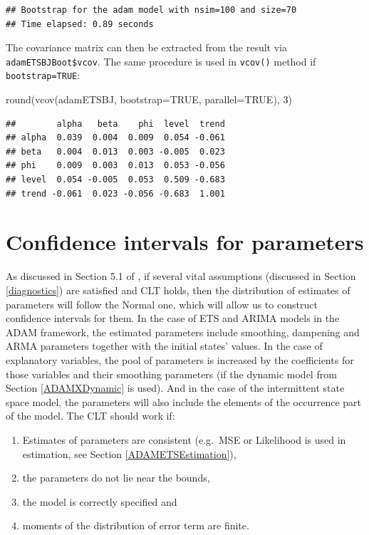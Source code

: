 \documentclass[
]{book}
\newenvironment{Shaded}{\begin{snugshade}}{\end{snugshade}}
\newcommand{\AttributeTok}[1]{\textcolor[rgb]{0.77,0.63,0.00}{#1}}
\newcommand{\ConstantTok}[1]{\textcolor[rgb]{0.00,0.00,0.00}{#1}}
\newcommand{\DecValTok}[1]{\textcolor[rgb]{0.00,0.00,0.81}{#1}}
\newcommand{\FunctionTok}[1]{\textcolor[rgb]{0.00,0.00,0.00}{#1}}
\newcommand{\NormalTok}[1]{#1}
\providecommand{\tightlist}{%
  \setlength{\itemsep}{0pt}\setlength{\parskip}{0pt}}
\theoremstyle{definition}
\theoremstyle{definition}
\theoremstyle{definition}
\theoremstyle{definition}
\theoremstyle{remark}
\begin{document}
\begin{verbatim}
## Bootstrap for the adam model with nsim=100 and size=70
## Time elapsed: 0.89 seconds
\end{verbatim}

The covariance matrix can then be extracted from the result via \texttt{adamETSBJBoot\$vcov}. The same procedure is used in \texttt{vcov()} method if \texttt{bootstrap=TRUE}:

\begin{Shaded}
\begin{Highlighting}[]
\FunctionTok{round}\NormalTok{(}\FunctionTok{vcov}\NormalTok{(adamETSBJ, }\AttributeTok{bootstrap=}\ConstantTok{TRUE}\NormalTok{, }\AttributeTok{parallel=}\ConstantTok{TRUE}\NormalTok{), }\DecValTok{3}\NormalTok{)}
\end{Highlighting}
\end{Shaded}

\begin{verbatim}
##        alpha   beta    phi  level  trend
## alpha  0.039  0.004  0.009  0.054 -0.061
## beta   0.004  0.013  0.003 -0.005  0.023
## phi    0.009  0.003  0.013  0.053 -0.056
## level  0.054 -0.005  0.053  0.509 -0.683
## trend -0.061  0.023 -0.056 -0.683  1.001
\end{verbatim}

\hypertarget{confidence-intervals-for-parameters}{%
\section{Confidence intervals for parameters}\label{confidence-intervals-for-parameters}}

As discussed in Section 5.1 of \citet{SvetunkovSBA}, if several vital assumptions (discussed in Section \ref{diagnostics}) are satisfied and CLT holds, then the distribution of estimates of parameters will follow the Normal one, which will allow us to construct confidence intervals for them. In the case of ETS and ARIMA models in the ADAM framework, the estimated parameters include smoothing, dampening and ARMA parameters together with the initial states' values. In the case of explanatory variables, the pool of parameters is increased by the coefficients for those variables and their smoothing parameters (if the dynamic model from Section \ref{ADAMXDynamic} is used). And in the case of the intermittent state space model, the parameters will also include the elements of the occurrence part of the model. The CLT should work if:

\begin{enumerate}
\def\labelenumi{\arabic{enumi}.}
\tightlist
\item
  Estimates of parameters are consistent (e.g.~MSE or Likelihood is used in estimation, see Section \ref{ADAMETSEstimation}),
\item
  the parameters do not lie near the bounds,
\item
  the model is correctly specified and
\item
  moments of the distribution of error term are finite.
\end{enumerate}
\end{document}
